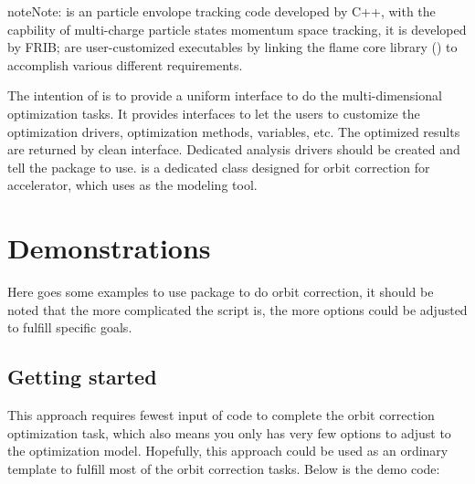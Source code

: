 \documentclass[letterpaper,10pt,english]{sphinxmanual}
\begin{document}

\begin{notice}{note}{Note:}
 is an particle envolope tracking code developed by C++,
with the capbility of multi-charge particle states momentum space
tracking, it is developed by FRIB;  are
user-customized executables by linking the flame core library
() to accomplish various different requirements.
\end{notice}

The intention of  is to provide a uniform interface to do the
multi-dimensional optimization tasks. It provides interfaces to let the
users to customize the optimization drivers, optimization methods,
variables, etc. The optimized results are returned by clean interface.
Dedicated analysis drivers should be created and tell the package to use.
 is a dedicated class designed for orbit correction for
accelerator, which uses  as the modeling tool.


\chapter{Demonstrations}
\label{src/demos::doc}\label{src/demos:demonstrations}
Here goes some examples to use  package to do orbit correction,
it should be noted that the more complicated the script is,
the more options could be adjusted to fulfill specific goals.


\section{Getting started}
\label{src/demos/demo1:getting-started}\label{src/demos/demo1::doc}\label{src/demos/demo1:simplest-approach}
This approach requires fewest input of code to complete the orbit
correction optimization task, which also means you only has very few
options to adjust to the optimization model. Hopefully, this approach
could be used as an ordinary template to fulfill most of the orbit
correction tasks. Below is the demo code:
\end{document}
